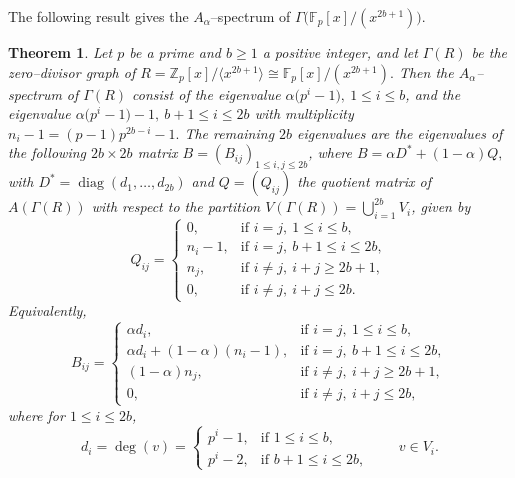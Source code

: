 \documentclass[12pt,twoside]{article}
\newtheorem{theorem}{Theorem}[section]
\begin{document}
The following result gives the $A_\alpha$--spectrum of $ \varGamma\bigl(\mathbb{F}_p[x]/(x^{2b+1})\bigr)$. 
\begin{theorem}\label{spectra thm odd}
	Let $p$ be a prime and $b\ge 1$ a positive integer, and  let $ \varGamma(R)$ be the zero--divisor graph of $R = \mathbb{Z}_p[x]/\langle x^{2b+1}\rangle \cong \mathbb{F}_p[x]/(x^{2b+1}).$ Then the $A_\alpha$--spectrum of $ \varGamma(R)$ consist of the eigenvalue $ \alpha\bigl(p^{ i}-1\bigr),~ 1\le i\le b$, and the eigenvalue $ \alpha\bigl(p^{ i}-1\bigr) - 1,~b+1\le i\le 2b$ with multiplicity $n_i - 1 = (p-1)p^{ 2b-i} - 1.$ The remaining $2b$ eigenvalues are the eigenvalues of the following $2b\times 2b$ matrix $B=(B_{ij})_{1\le i,j\le 2b}$,
		where	$B = \alpha D^\ast + (1-\alpha)Q,$	with	$D^\ast = \operatorname{diag}(d_1,\dots,d_{2b})$
		and $Q=(Q_{ij})$ the quotient matrix of $A( \varGamma(R))$ with respect to the partition
		$V( \varGamma(R))=\bigcup_{i=1}^{2b}V_i$, given by
		\[
		Q_{ij} =
		\begin{cases}
			0, & \text{if } i=j,\ 1\le i\le b,\\[3pt]
			n_i - 1, & \text{if } i=j,\ b+1\le i\le 2b,\\[3pt]
			n_j, & \text{if } i\ne j,\ i+j\ge 2b+1,\\[3pt]
			0, & \text{if } i\ne j,\ i+j\le 2b.
		\end{cases}
		\]
		Equivalently,
		\[
		B_{ij} =
		\begin{cases}
			\alpha d_i, & \text{if } i=j,\ 1\le i\le b,\\[3pt]
			\alpha d_i + (1-\alpha)(n_i-1), & \text{if } i=j,\ b+1\le i\le 2b,\\[3pt]
			(1-\alpha)n_j, & \text{if } i\ne j,\ i+j\ge 2b+1,\\[3pt]
			0, & \text{if } i\ne j,\ i+j\le 2b,
		\end{cases}
		\]
		where	for 	$1\le i\le 2b$,
	\[
	d_i = \deg(v) =
	\begin{cases}
		p^{ i} - 1, & \text{if } 1\le i\le b,\\[3pt]
		p^{ i} - 2, & \text{if } b+1\le i\le 2b,
	\end{cases}
	\qquad v\in V_i.
	\]
\end{theorem}
\end{document}

